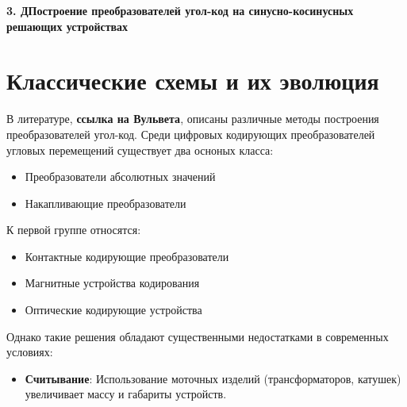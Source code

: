 \newpage
\begin{center}
  \textbf{\large 3. ДПостроение преобразователей угол-код на синусно-косинусных решающих устройствах}
\end{center}


\section{Классические схемы и их эволюция}


В литературе, \textbf{ссылка на Вульвета}, описаны различные методы построения преобразователей угол-код. 
Среди цифровых кодирующих преобразователей угловых перемещений существует два осноных класса: 
\begin{itemize}
  \item Преобразователи абсолютных значений
  \item Накапливающие преобразователи 
\end{itemize}

К первой группе относятся:
\begin{itemize}
  \item Контактные кодирующие преобразователи 
  \item Магнитные устройства кодирования
  \item Оптические кодирующие устройства
\end{itemize}

Однако такие решения обладают существенными недостатками в современных условиях:
\begin{itemize}
  \item \textbf{Считывание}: Использование моточных изделий (трансформаторов, катушек) увеличивает массу и габариты устройств.
\end{itemize}

